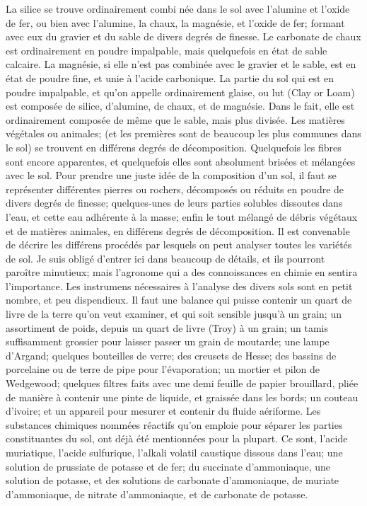 La silice se trouve ordinairement combi\setcounter{page}{419} née dans le sol avec l’alumine et l’oxide de fer, ou bien avec l’alumine, la chaux, la magnésie, et l’oxide de fer; formant avec eux du gravier et du sable de divers degrés de finesse. Le carbonate de chaux est ordinairement en poudre impalpable, mais quelquefois en état de sable calcaire. La magnésie, si elle n’est pas combinée avec le gravier et le sable, est en état de poudre fine, et unie à l’acide carbonique. La partie du sol qui est en poudre impalpable, et qu’on appelle ordinairement glaise, ou lut (Clay or Loam) est composée de silice, d’alumine, de chaux, et de magnésie. Dans le fait, elle est ordinairement composée de même que le sable, mais plus divisée. Les matières végétales ou animales; (et les premières sont de beaucoup les plus communes dans le sol) se trouvent en différens degrés de décomposition. Quelquefois les fibres sont encore apparentes, et quelquefois elles sont absolument brisées et mélangées avec le sol.
Pour prendre une juste idée de la composition d’un sol, il faut se représenter différentes pierres ou rochers, décomposés ou réduits en poudre de divers degrés de finesse; quelques-unes de leurs parties solubles dissoutes dans l’eau, et cette eau adhérente à la masse; enfin le tout mélangé de débris\setcounter{page}{420} végétaux et de matières animales, en différens degrés de décomposition.
Il est convenable de décrire les différens procédés par lesquels on peut analyser toutes les variétés de sol. Je suis obligé d'entrer ici dans beaucoup de détails, et ils pourront paroître minutieux; mais l'agronome qui a des connoissances en chimie en sentira l'importance.
Les instrumens nécessaires à l'analyse des divers sols sont en petit nombre, et peu dispendieux. Il faut une balance qui puisse contenir un quart de livre de la terre qu'on veut examiner, et qui soit sensible jusqu'à un grain; un assortiment de poids, depuis un quart de livre (Troy) à un grain; un tamis suffisamment grossier pour laisser passer un grain de moutarde; une lampe d'Argand; quelques bouteilles de verre; des creusets de Hesse; des bassins de porcelaine ou de terre de pipe pour l'évaporation; un mortier et pilon de Wedgewood; quelques filtres faits avec une demi feuille de papier brouillard, pliée de manière à contenir une pinte de liquide, et graissée dans les bords; un couteau d'ivoire; et un appareil pour mesurer et contenir du fluide aériforme.
Les substances chimiques nommées réactifs qu'on emploie pour séparer les parties\setcounter{page}{421} constituantes du sol, ont déjà été mentionnées pour la plupart. Ce sont, l'acide muriatique, l'acide sulfurique, l'alkali volatil caustique dissous dans l'eau; une solution de prussiate de potasse et de fer; du succinate d'ammoniaque, une solution de potasse, et des solutions de carbonate d'ammoniaque, de muriate d'ammoniaque, de nitrate d'ammoniaque, et de carbonate de potasse.
